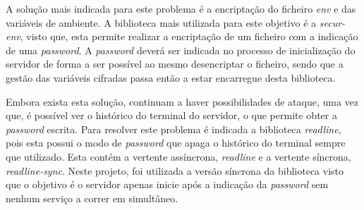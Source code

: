 A solução mais indicada para este problema é a encriptação do ficheiro \textit{env} e das variáveis de ambiente. A biblioteca mais utilizada para este objetivo é a \textit{secur-env}, visto que, esta permite realizar a encriptação de um ficheiro com a indicação de uma \textit{password}. A \textit{password} deverá ser indicada no processo de inicialização do servidor de forma a ser possível ao mesmo desencriptar o ficheiro, sendo que a gestão das variáveis cifradas passa então a estar encarregue desta biblioteca.

Embora exista esta solução, continuam a haver possibilidades de ataque, uma vez que, é possível ver o histórico do terminal do servidor, o que permite obter a \textit{password} escrita. Para resolver este problema é indicada a biblioteca \textit{readline}, pois esta possui o modo de \textit{password} que apaga o histórico do terminal sempre que utilizado. Esta contém a vertente assíncrona, \textit{readline} e a vertente síncrona, \textit{readline-sync}. Neste projeto, foi utilizada a versão síncrona da biblioteca visto que o objetivo é o servidor apenas inicie após a indicação da \textit{password} sem nenhum serviço a correr em simultâneo.
